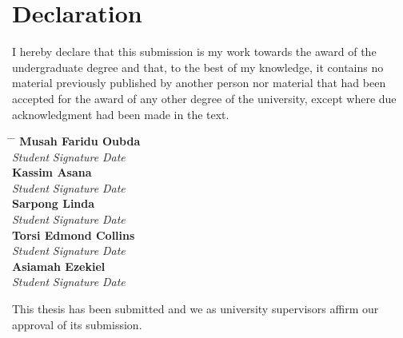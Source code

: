 \documentclass[doublespacing]{report} %
\begin{document}
\chapter*{Declaration}

\vspace{1cm}

I hereby declare that this submission is my work towards the award of the undergraduate degree and that, to the best of my knowledge, it contains no material previously published by another person nor material that had been accepted for the award of any other degree of the university, except where due acknowledgment had been made in the text.

\vspace{2cm}

\begin{tabbing}
    \hspace{6cm} \= \hspace{4cm} \= \hspace{5cm} \kill
    \textbf{Musah Faridu Oubda} \> \makebox[4cm]{\dotfill} \> \makebox[4cm]{\dotfill} \\
    \textit{Student} \> \textit{Signature} \> \textit{Date} \\[1.5cm]
    \textbf{Kassim Asana} \> \makebox[3cm]{\dotfill} \> \makebox[3cm]{\dotfill} \\
    \textit{Student} \> \textit{Signature} \> \textit{Date} \\[1.5cm]
    \textbf{Sarpong Linda} \> \makebox[3cm]{\dotfill} \> \makebox[3cm]{\dotfill} \\
    \textit{Student} \> \textit{Signature} \> \textit{Date} \\[1.5cm]
    \textbf{Torsi Edmond Collins} \> \makebox[3cm]{\dotfill} \> \makebox[3cm]{\dotfill} \\
    \textit{Student} \> \textit{Signature} \> \textit{Date} \\[1.5cm]
    \textbf{Asiamah Ezekiel} \> \makebox[3cm]{\dotfill} \> \makebox[3cm]{\dotfill} \\
    \textit{Student} \> \textit{Signature} \> \textit{Date} \\[1.5cm]
\end{tabbing}
This thesis has been submitted and we as university supervisors affirm our approval of
its submission.\\
\end{document}
